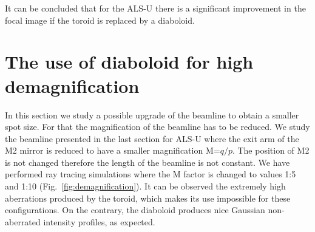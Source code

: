 \documentclass{iucr}              %
\begin{document}
It can be concluded that for the ALS-U there is a significant improvement in the focal image if the toroid is replaced by a diaboloid.
 

\section{The use of diaboloid for high demagnification}
\label{sec:scan}

In this section we study a possible upgrade of the beamline to obtain a smaller spot size. For that the magnification of the beamline has to be reduced. We study the beamline presented in the last section for ALS-U where the exit arm of the M2 mirror is reduced to have a smaller magnification M=$q/p$. The position of M2 is not changed therefore the length of the beamline is not constant. We have performed ray tracing simulations where the M factor is changed to values 1:5 and 1:10 (Fig.~\ref{fig:demagnification}). It can be observed the extremely high aberrations produced by the toroid, which makes its use impossible for these configurations. On the contrary, the diaboloid produces nice Gaussian non-aberrated intensity profiles, as expected.
\end{document}
